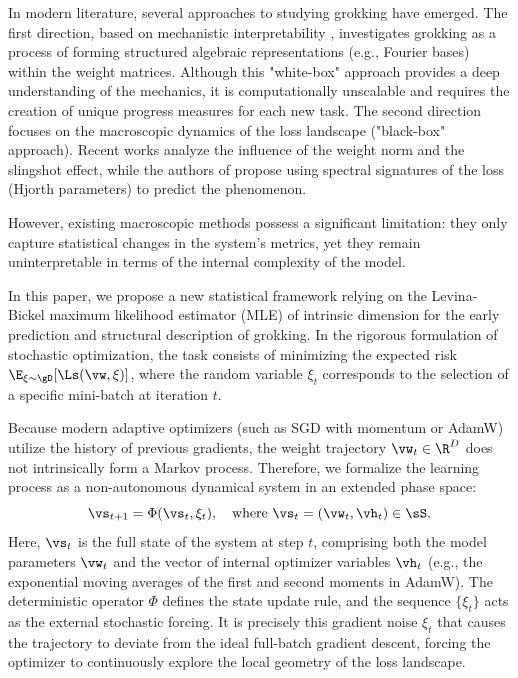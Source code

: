 \documentclass{article}
\begin{document}
In modern literature, several approaches to studying grokking have emerged. The first direction, based on mechanistic interpretability \citep{nanda2023progress, chughtai2023toy}, investigates grokking as a process of forming structured algebraic representations (e.g., Fourier bases) within the weight matrices. Although this "white-box" approach provides a deep understanding of the mechanics, it is computationally unscalable and requires the creation of unique progress measures for each new task. The second direction focuses on the macroscopic dynamics of the loss landscape ("black-box" approach). Recent works \citep{liu2022omnigrok, thilak2022slingshot} analyze the influence of the weight norm and the slingshot effect, while the authors of \citep{notsawo2023predicting} propose using spectral signatures of the loss (Hjorth parameters) to predict the phenomenon.

However, existing macroscopic methods possess a significant limitation: they only capture statistical changes in the system's metrics, yet they remain uninterpretable in terms of the internal complexity of the model.

In this paper, we propose a new statistical framework relying on the Levina-Bickel maximum likelihood estimator (MLE) of intrinsic dimension for the early prediction and structural description of grokking. In the rigorous formulation of stochastic optimization, the task consists of minimizing the expected risk $\E_{\xi \sim \gD}[\Ls(\vw, \xi)]$, where the random variable $\xi_t$ corresponds to the selection of a specific mini-batch at iteration $t$.

Because modern adaptive optimizers (such as SGD with momentum or AdamW) utilize the history of previous gradients, the weight trajectory $\vw_t \in \R^D$ does not intrinsically form a Markov process. Therefore, we formalize the learning process as a non-autonomous dynamical system in an extended phase space:
\begin{equation}
    \vs_{t+1} = \Phi(\vs_t, \xi_t), \quad \text{where } \vs_t = (\vw_t, \vh_t) \in \sS.
\end{equation}
Here, $\vs_t$ is the full state of the system at step $t$, comprising both the model parameters $\vw_t$ and the vector of internal optimizer variables $\vh_t$ (e.g., the exponential moving averages of the first and second moments in AdamW). The deterministic operator $\Phi$ defines the state update rule, and the sequence $\{\xi_t\}$ acts as the external stochastic forcing. It is precisely this gradient noise $\xi_t$ that causes the trajectory to deviate from the ideal full-batch gradient descent, forcing the optimizer to continuously explore the local geometry of the loss landscape.
\end{document}
